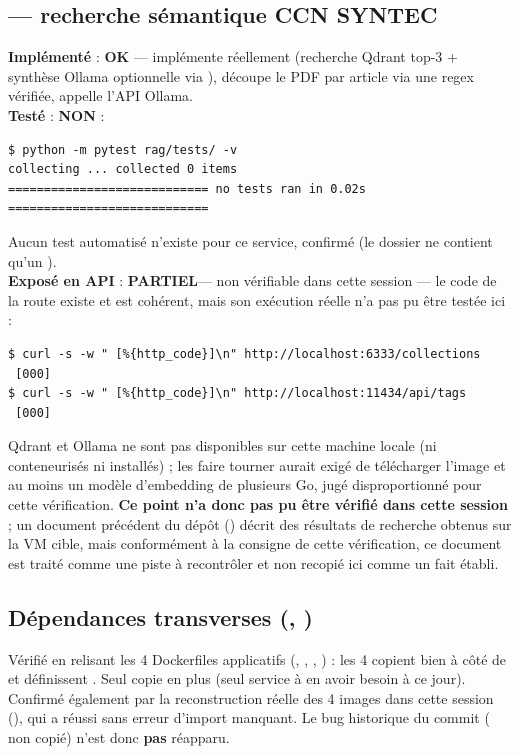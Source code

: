 \documentclass[11pt,a4paper]{article}
\newcommand{\etat}[2]{\textbf{#1} : #2}
\newcommand{\ok}{\textcolor{green!45!black}{\textbf{OK}}}
\newcommand{\ko}{\textcolor{red!60!black}{\textbf{NON}}}
\newcommand{\partiel}{\textcolor{orange!70!black}{\textbf{PARTIEL}}}
\begin{document}
\subsection{ --- recherche s\'emantique CCN SYNTEC}
\label{sec:rag}
\etat{Impl\'ement\'e}{\ok} ---  impl\'emente r\'eellement  (recherche Qdrant top-3 + synth\`ese Ollama optionnelle via ),  d\'ecoupe le PDF par article via une regex v\'erifi\'ee,  appelle l'API Ollama.\\
\etat{Test\'e}{\ko} :
\begin{lstlisting}
$ python -m pytest rag/tests/ -v
collecting ... collected 0 items
============================ no tests ran in 0.02s ============================
\end{lstlisting}
Aucun test automatis\'e n'existe pour ce service, confirm\'e (le dossier  ne contient qu'un ).\\
\etat{Expos\'e en API}{\partiel --- non v\'erifiable dans cette session} --- le code de la route existe et est coh\'erent, mais son ex\'ecution r\'eelle n'a pas pu \^etre test\'ee ici :
\begin{lstlisting}
$ curl -s -w " [%{http_code}]\n" http://localhost:6333/collections
 [000]
$ curl -s -w " [%{http_code}]\n" http://localhost:11434/api/tags
 [000]
\end{lstlisting}
Qdrant et Ollama ne sont pas disponibles sur cette machine locale (ni conteneuris\'es ni install\'es) ; les faire tourner aurait exig\'e de t\'el\'echarger l'image  et au moins un mod\`ele d'embedding de plusieurs Go, jug\'e disproportionn\'e pour cette v\'erification. \textbf{Ce point n'a donc pas pu \^etre v\'erifi\'e dans cette session} ; un document pr\'ec\'edent du d\'ep\^ot () d\'ecrit des r\'esultats de recherche obtenus sur la VM cible, mais conform\'ement \`a la consigne de cette v\'erification, ce document est trait\'e comme une piste \`a recontr\^oler et non recopi\'e ici comme un fait \'etabli.

\subsection{D\'ependances transverses (, )}
\label{sec:dependances}
V\'erifi\'e en relisant les 4 Dockerfiles applicatifs (, , , ) : les 4 copient bien  \`a c\^ot\'e de  et d\'efinissent . Seul  copie  en plus (seul service \`a en avoir besoin \`a ce jour). Confirm\'e \'egalement par la reconstruction r\'eelle des 4 images dans cette session (), qui a r\'eussi sans erreur d'import manquant. Le bug historique du commit  ( non copi\'e) n'est donc \textbf{pas} r\'eapparu.
\end{document}
